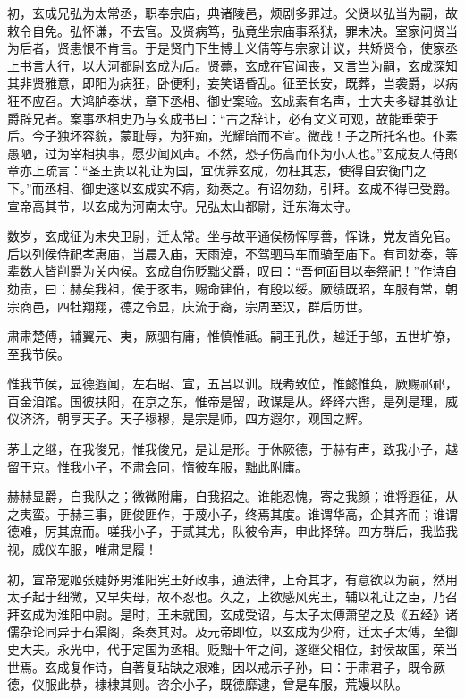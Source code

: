 \documentclass[12pt,UTF8]{ctexbook}
\begin{document}
初，玄成兄弘为太常丞，职奉宗庙，典诸陵邑，烦剧多罪过。父贤以弘当为嗣，故敕令自免。弘怀谦，不去官。及贤病笃，弘竟坐宗庙事系狱，罪未决。室家问贤当为后者，贤恚恨不肯言。于是贤门下生博士义倩等与宗家计议，共矫贤令，使家丞上书言大行，以大河都尉玄成为后。贤薨，玄成在官闻丧，又言当为嗣，玄成深知其非贤雅意，即阳为病狂，卧便利，妄笑语昏乱。征至长安，既葬，当袭爵，以病狂不应召。大鸿胪奏状，章下丞相、御史案验。玄成素有名声，士大夫多疑其欲让爵辟兄者。案事丞相史乃与玄成书曰：“古之辞让，必有文义可观，故能垂荣于后。今子独坏容貌，蒙耻辱，为狂痴，光耀暗而不宣。微哉！子之所托名也。仆素愚陋，过为宰相执事，愿少闻风声。不然，恐子伤高而仆为小人也。”玄成友人侍郎章亦上疏言：“圣王贵以礼让为国，宜优养玄成，勿枉其志，使得自安衡门之下。”而丞相、御史遂以玄成实不病，劾奏之。有诏勿劾，引拜。玄成不得已受爵。宣帝高其节，以玄成为河南太守。兄弘太山都尉，迁东海太守。



数岁，玄成征为未央卫尉，迁太常。坐与故平通侯杨恽厚善，恽诛，党友皆免官。后以列侯侍祀孝惠庙，当晨入庙，天雨淖，不驾驷马车而骑至庙下。有司劾奏，等辈数人皆削爵为关内侯。玄成自伤贬黜父爵，叹曰：“吾何面目以奉祭祀！”作诗自劾责，曰：赫矣我祖，侯于豕韦，赐命建伯，有殷以绥。厥绩既昭，车服有常，朝宗商邑，四牡翔翔，德之令显，庆流于裔，宗周至汉，群后历世。



肃肃楚傅，辅翼元、夷，厥驷有庸，惟慎惟祗。嗣王孔佚，越迁于邹，五世圹僚，至我节侯。



惟我节侯，显德遐闻，左右昭、宣，五吕以训。既耇致位，惟懿惟奂，厥赐祁祁，百金洎馆。国彼扶阳，在京之东，惟帝是留，政谋是从。绎绎六辔，是列是理，威仪济济，朝享天子。天子穆穆，是宗是师，四方遐尔，观国之辉。



茅土之继，在我俊兄，惟我俊兄，是让是形。于休厥德，于赫有声，致我小子，越留于京。惟我小子，不肃会同，惰彼车服，黜此附庸。



赫赫显爵，自我队之；微微附庸，自我招之。谁能忍愧，寄之我颜；谁将遐征，从之夷蛮。于赫三事，匪俊匪作，于蔑小子，终焉其度。谁谓华高，企其齐而；谁谓德难，厉其庶而。嗟我小子，于贰其尤，队彼令声，申此择辞。四方群后，我监我视，威仪车服，唯肃是履！



初，宣帝宠姬张婕妤男淮阳宪王好政事，通法律，上奇其才，有意欲以为嗣，然用太子起于细微，又早失母，故不忍也。久之，上欲感风宪王，辅以礼让之臣，乃召拜玄成为淮阳中尉。是时，王未就国，玄成受诏，与太子太傅萧望之及《五经》诸儒杂论同异于石渠阁，条奏其对。及元帝即位，以玄成为少府，迁太子太傅，至御史大夫。永光中，代于定国为丞相。贬黜十年之间，遂继父相位，封侯故国，荣当世焉。玄成复作诗，自著复玷缺之艰难，因以戒示子孙，曰：于肃君子，既令厥德，仪服此恭，棣棣其则。咨余小子，既德靡逮，曾是车服，荒嫚以队。
\end{document}

